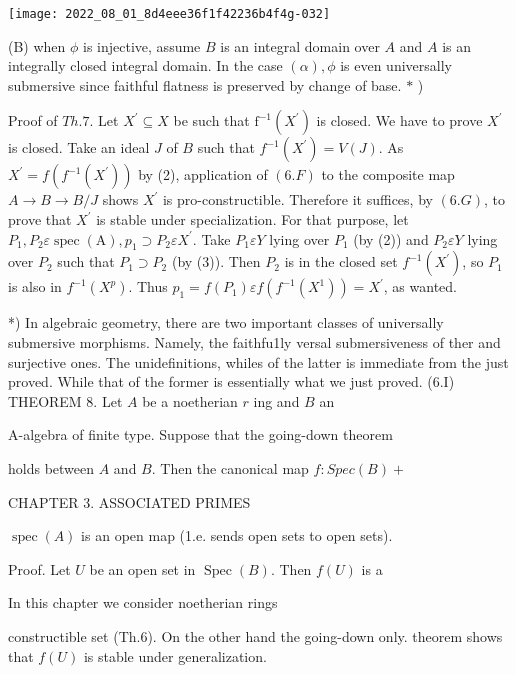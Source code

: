 \texttt{[image: 2022\_08\_01\_8d4eee36f1f42236b4f4g-032]}

(B) when $\phi$ is injective, assume $B$ is an integral domain over $A$ and $A$ is an integrally closed integral domain. In the case $(\alpha), \phi$ is even universally submersive since faithful flatness is preserved by change of base. $*$ )

Proof of $T h .7$. Let $X^{\prime} \subseteq X$ be such that $\mathrm{f}^{-1}\left(X^{\prime}\right)$ is closed. We have to prove $X^{\prime}$ is closed. Take an ideal $J$ of $B$ such that $f^{-1}\left(X^{\prime}\right)=V(J)$. As $X^{\prime}=f\left(f^{-1}\left(X^{\prime}\right)\right)$ by (2), application of $(6 . F)$ to the composite map $A \rightarrow B \rightarrow B / J$ shows $X^{\prime}$ is pro-constructible. Therefore it suffices, by $(6 . G)$, to prove that $X^{\prime}$ is stable under specialization. For that purpose, let $P_{1}, P_{2} \varepsilon \operatorname{spec}(\mathrm{A}), p_{1} \supset P_{2} \varepsilon X^{\prime}$. Take $P_{1} \varepsilon Y$ lying over $P_{1}$ (by (2)) and $P_{2} \varepsilon Y$ lying over $P_{2}$ such that $P_{1} \supset P_{2}$ (by (3)). Then $P_{2}$ is in the closed set $f^{-1}\left(X^{\prime}\right)$, so $P_{1}$ is also in $f^{-1}\left(X^{p}\right)$. Thus $p_{1}=f\left(P_{1}\right) \varepsilon f\left(f^{-1}\left(X^{1}\right)\right)=X^{\prime}$, as wanted.

*) In algebraic geometry, there are two important classes of universally submersive morphisms. Namely, the faithfu1ly versal submersiveness of ther and surjective ones. The unidefinitions, whiles of the latter is immediate from the just proved. While that of the former is essentially what we just proved. (6.I) THEOREM 8. Let $A$ be a noetherian $r$ ing and $B$ an

A-algebra of finite type. Suppose that the going-down theorem

holds between $A$ and $B$. Then the canonical map $f: S p e c(B)+$

CHAPTER 3. ASSOCIATED PRIMES

$\operatorname{spec}(A)$ is an open map (1.e. sends open sets to open sets).

Proof. Let $U$ be an open set in $\operatorname{Spec}(B)$. Then $f(U)$ is a

In this chapter we consider noetherian rings

constructible set (Th.6). On the other hand the going-down only. theorem shows that $f(U)$ is stable under generalization.

